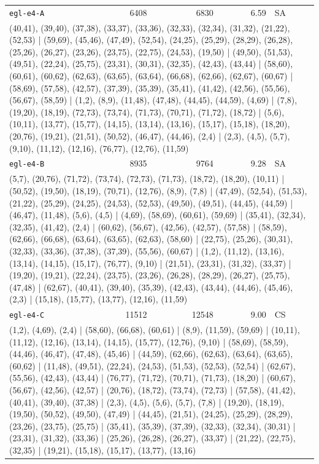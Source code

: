 \begin{longtable}{lrrrl}
\texttt{egl-e4-A} & 6408 & 6830 & 6.59 & SA \\
\multicolumn{5}{p{0.96\linewidth}}{\tiny\raggedright\arraybackslash (40,41), (39,40), (37,38), (33,37), (33,36), (32,33), (32,34), (31,32), (21,22), (52,53) | (59,69), (45,46), (47,49), (52,54), (24,25), (25,29), (28,29), (26,28), (25,26), (26,27), (23,26), (23,75), (22,75), (24,53), (19,50) | (49,50), (51,53), (49,51), (22,24), (25,75), (23,31), (30,31), (32,35), (42,43), (43,44) | (58,60), (60,61), (60,62), (62,63), (63,65), (63,64), (66,68), (62,66), (62,67), (60,67) | (58,69), (57,58), (42,57), (37,39), (35,39), (35,41), (41,42), (42,56), (55,56), (56,67), (58,59) | (1,2), (8,9), (11,48), (47,48), (44,45), (44,59), (4,69) | (7,8), (19,20), (18,19), (72,73), (73,74), (71,73), (70,71), (71,72), (18,72) | (5,6), (10,11), (13,77), (15,77), (14,15), (13,14), (13,16), (15,17), (15,18), (18,20), (20,76), (19,21), (21,51), (50,52), (46,47), (44,46), (2,4) | (2,3), (4,5), (5,7), (9,10), (11,12), (12,16), (76,77), (12,76), (11,59)} \\[2pt]
\texttt{egl-e4-B} & 8935 & 9764 & 9.28 & SA \\
\multicolumn{5}{p{0.96\linewidth}}{\tiny\raggedright\arraybackslash (5,7), (20,76), (71,72), (73,74), (72,73), (71,73), (18,72), (18,20), (10,11) | (50,52), (19,50), (18,19), (70,71), (12,76), (8,9), (7,8) | (47,49), (52,54), (51,53), (21,22), (25,29), (24,25), (24,53), (52,53), (49,50), (49,51), (44,45), (44,59) | (46,47), (11,48), (5,6), (4,5) | (4,69), (58,69), (60,61), (59,69) | (35,41), (32,34), (32,35), (41,42), (2,4) | (60,62), (56,67), (42,56), (42,57), (57,58) | (58,59), (62,66), (66,68), (63,64), (63,65), (62,63), (58,60) | (22,75), (25,26), (30,31), (32,33), (33,36), (37,38), (37,39), (55,56), (60,67) | (1,2), (11,12), (13,16), (13,14), (14,15), (15,17), (76,77), (9,10) | (21,51), (23,31), (31,32), (33,37) | (19,20), (19,21), (22,24), (23,75), (23,26), (26,28), (28,29), (26,27), (25,75), (47,48) | (62,67), (40,41), (39,40), (35,39), (42,43), (43,44), (44,46), (45,46), (2,3) | (15,18), (15,77), (13,77), (12,16), (11,59)} \\[2pt]
\texttt{egl-e4-C} & 11512 & 12548 & 9.00 & CS \\
\multicolumn{5}{p{0.96\linewidth}}{\tiny\raggedright\arraybackslash (1,2), (4,69), (2,4) | (58,60), (66,68), (60,61) | (8,9), (11,59), (59,69) | (10,11), (11,12), (12,16), (13,14), (14,15), (15,77), (12,76), (9,10) | (58,69), (58,59), (44,46), (46,47), (47,48), (45,46) | (44,59), (62,66), (62,63), (63,64), (63,65), (60,62) | (11,48), (49,51), (22,24), (24,53), (51,53), (52,53), (52,54) | (62,67), (55,56), (42,43), (43,44) | (76,77), (71,72), (70,71), (71,73), (18,20) | (60,67), (56,67), (42,56), (42,57) | (20,76), (18,72), (73,74), (72,73) | (57,58), (41,42), (40,41), (39,40), (37,38) | (2,3), (4,5), (5,6), (5,7), (7,8) | (19,20), (18,19), (19,50), (50,52), (49,50), (47,49) | (44,45), (21,51), (24,25), (25,29), (28,29), (23,26), (23,75), (25,75) | (35,41), (35,39), (37,39), (32,33), (32,34), (30,31) | (23,31), (31,32), (33,36) | (25,26), (26,28), (26,27), (33,37) | (21,22), (22,75), (32,35) | (19,21), (15,18), (15,17), (13,77), (13,16)} \\[2pt]

\end{longtable}
